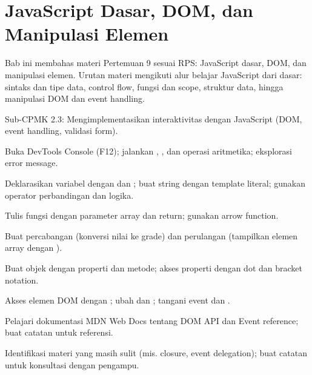 \documentclass[../main.tex]{subfiles}
\begin{document}
\chapter{JavaScript Dasar, DOM, dan Manipulasi Elemen}

Bab ini membahas materi Pertemuan 9 sesuai RPS: JavaScript dasar, DOM, dan manipulasi elemen. Urutan materi mengikuti alur belajar JavaScript dari dasar: sintaks dan tipe data, control flow, fungsi dan scope, struktur data, hingga manipulasi DOM dan event handling.

\begin{subcpmk}
  \item Sub-CPMK 2.3: Mengimplementasikan interaktivitas dengan JavaScript (DOM, event handling, validasi form).
\end{subcpmk}



















\begin{aktivitas}
  \item Buka DevTools Console (F12); jalankan , , dan operasi aritmetika; eksplorasi error message.
  \item Deklarasikan variabel dengan  dan ; buat string dengan template literal; gunakan operator perbandingan \code{===} dan logika.
  \item Tulis fungsi  dengan parameter array dan return; gunakan arrow function.
  \item Buat percabangan (konversi nilai ke grade) dan perulangan (tampilkan elemen array dengan ).
  \item Buat objek  dengan properti dan metode; akses properti dengan dot dan bracket notation.
  \item Akses elemen DOM dengan ; ubah  dan ; tangani event  dan .
  \item Pelajari dokumentasi MDN Web Docs tentang DOM API dan Event reference; buat catatan untuk referensi.
  \item Identifikasi materi yang masih sulit (mis. closure, event delegation); buat catatan untuk konsultasi dengan pengampu.
\end{aktivitas}
\end{document}
